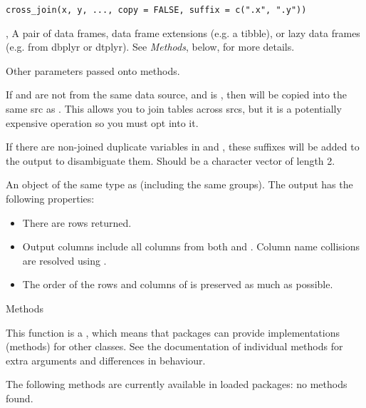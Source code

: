 \documentclass[a4paper]{book}
\begin{document}
%
\begin{Usage}
\begin{verbatim}
cross_join(x, y, ..., copy = FALSE, suffix = c(".x", ".y"))
\end{verbatim}
\end{Usage}
%
\begin{Arguments}
\begin{ldescription}
\item[\code{x}, \code{y}] A pair of data frames, data frame extensions (e.g. a tibble), or
lazy data frames (e.g. from dbplyr or dtplyr). See \emph{Methods}, below, for
more details.

\item[\code{...}] Other parameters passed onto methods.

\item[\code{copy}] If  and  are not from the same data source,
and  is , then  will be copied into the
same src as .  This allows you to join tables across srcs, but
it is a potentially expensive operation so you must opt into it.

\item[\code{suffix}] If there are non-joined duplicate variables in  and
, these suffixes will be added to the output to disambiguate them.
Should be a character vector of length 2.
\end{ldescription}
\end{Arguments}
%
\begin{Value}
An object of the same type as  (including the same groups). The output has
the following properties:
\begin{itemize}

\item{} There are  rows returned.
\item{} Output columns include all columns from both  and . Column name
collisions are resolved using .
\item{} The order of the rows and columns of  is preserved as much as possible.

\end{itemize}

\end{Value}
%
\begin{Section}{Methods}

This function is a , which means that packages can provide
implementations (methods) for other classes. See the documentation of
individual methods for extra arguments and differences in behaviour.

The following methods are currently available in loaded packages:
no methods found.
\end{Section}
\end{document}
